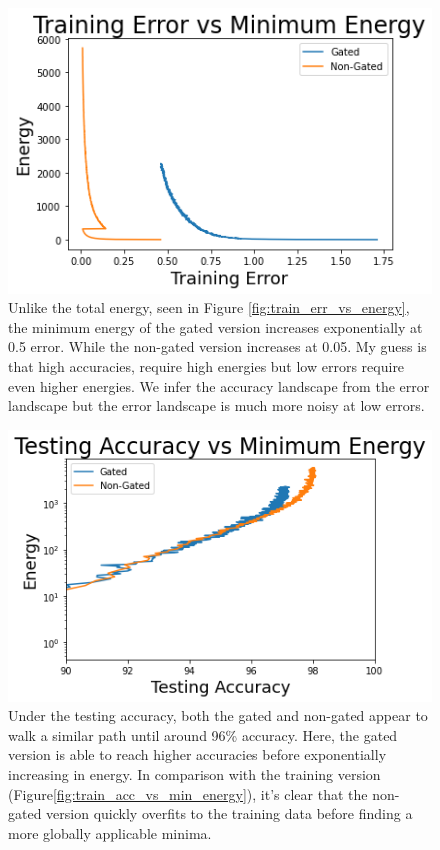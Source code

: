 \documentclass[prl,superscriptaddress,showpacs,twocolumn]{revtex4-1}
\begin{document}
\begin{figure}[H]
    \centering
    \includegraphics[width=\linewidth]{figures/training_error_vs_minimum_energy.png}
    \caption{Unlike the total energy, seen in Figure \ref{fig:train_err_vs_energy}, the minimum energy of the gated version increases exponentially at 0.5 error. While the non-gated version increases at 0.05. My guess is that high accuracies, require high energies but low errors require even higher energies. We infer the accuracy landscape from the error landscape but the error landscape is much more noisy at low errors.}
    \label{fig:train_err_vs_min_energy}
\end{figure}

\begin{figure}[H]
    \centering
    \includegraphics[width=\linewidth]{figures/testing_accuracy_vs_minimum_energy.png}
    \caption{Under the testing accuracy, both the gated and non-gated appear to walk a similar path until around 96\% accuracy. Here, the gated version is able to reach higher accuracies before exponentially increasing in energy. In comparison with the training version (Figure\ref{fig:train_acc_vs_min_energy}), it's clear that the non-gated version quickly overfits to the training data before finding a more globally applicable minima.}
    \label{fig:test_acc_vs_min_energy}
\end{figure}
\end{document}
